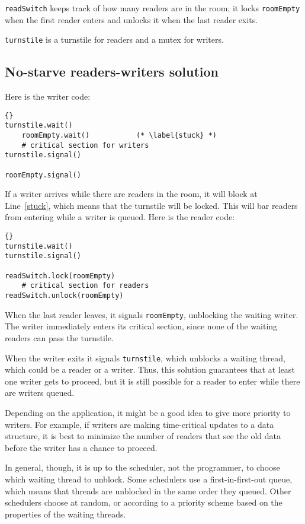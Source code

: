 \documentclass{book}
\newcommand{\clearemptydoublepage}{\newpage\cleardoublepage}
\begin{document}
{\tt readSwitch} keeps track of how many readers are in the room;
it locks {\tt roomEmpty} when the first reader
enters and unlocks it when the last reader exits.

{\tt turnstile} is a turnstile for readers and a 
mutex for writers.


\clearemptydoublepage
\subsection {No-starve readers-writers solution}  

Here is the writer code:

\begin{lstlisting}[title={No-starve writer solution}]{}
turnstile.wait()
    roomEmpty.wait()           (* \label{stuck} *)
    # critical section for writers
turnstile.signal()

roomEmpty.signal()
\end{lstlisting}

If a writer arrives while there are readers in the room, it
will block at Line~\ref{stuck}, which means that the turnstile will
be locked.  This will bar readers from entering while a writer
is queued.  Here is the reader code:

\begin{lstlisting}[title={No-starve reader solution}]{}
turnstile.wait()
turnstile.signal()

readSwitch.lock(roomEmpty)
    # critical section for readers
readSwitch.unlock(roomEmpty)
\end{lstlisting}

When the last reader leaves, it signals {\tt roomEmpty},
unblocking the waiting writer.  The writer immediately
enters its critical section, since none of the waiting
readers can pass the turnstile.

When the writer exits it signals {\tt turnstile}, which unblocks a
waiting thread, which could be a reader or a writer.  Thus, this
solution guarantees that at least one writer gets to proceed, but it
is still possible for a reader to enter while there are writers
queued.  

Depending on the application, it might be a good idea to
give more priority to writers.  For example, if writers are making
time-critical updates to a data structure, it is best
to minimize the number of readers that see the old data before
the writer has a chance to proceed.

In general, though, it is up to the scheduler, not the programmer,
to choose which waiting thread to unblock.
Some schedulers use a first-in-first-out queue, which means
that threads are unblocked in the same order they queued.
Other schedulers choose at random, or according to
a priority scheme based on the properties of the waiting
threads.
\end{document}
